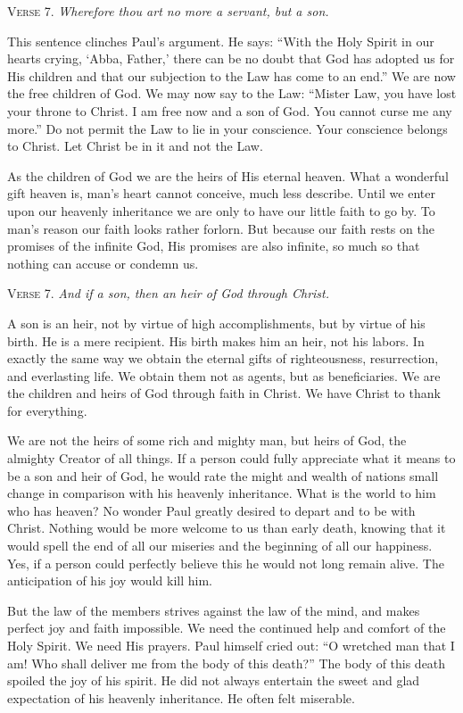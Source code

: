 \textsc{Verse} 7. \emph{Wherefore thou art no more a servant, but a son.}

This sentence clinches Paul’s argument. He says: “With the Holy Spirit in our hearts crying, ‘Abba, Father,’ there can be no doubt that God has adopted us for His children and that our subjection to the Law has come to an end.” We are now the free children of God. We may now say to the Law: “Mister Law, you have lost your throne to Christ. I am free now and a son of God. You cannot curse me any more.” Do not permit the Law to lie in your conscience. Your conscience belongs to Christ. Let Christ be in it and not the Law.

As the children of God we are the heirs of His eternal heaven. What a wonderful gift heaven is, man’s heart cannot conceive, much less describe. Until we enter upon our heavenly inheritance we are only to have our little faith to go by. To man’s reason our faith looks rather forlorn. But because our faith rests on the promises of the infinite God, His promises are also infinite, so much so that nothing can accuse or condemn us.

\textsc{Verse} 7. \emph{And if a son, then an heir of God through Christ.}

A son is an heir, not by virtue of high accomplishments, but by virtue of his birth. He is a mere recipient. His birth makes him an heir, not his labors. In exactly the same way we obtain the eternal gifts of righteousness, resurrection, and everlasting life. We obtain them not as agents, but as beneficiaries. We are the children and heirs of God through faith in Christ. We have Christ to thank for everything.

We are not the heirs of some rich and mighty man, but heirs of God, the almighty Creator of all things. If a person could fully appreciate what it means to be a son and heir of God, he would rate the might and wealth of nations small change in comparison with his heavenly inheritance. What is the world to him who has heaven? No wonder Paul greatly desired to depart and to be with Christ. Nothing would be more welcome to us than early death, knowing that it would spell the end of all our miseries and the beginning of all our happiness. Yes, if a person could perfectly believe this he would not long remain alive. The anticipation of his joy would kill him.

But the law of the members strives against the law of the mind, and makes perfect joy and faith impossible. We need the continued help and comfort of the Holy Spirit. We need His prayers. Paul himself cried out: “O wretched man that I am! Who shall deliver me from the body of this death?” The body of this death spoiled the joy of his spirit. He did not always entertain the sweet and glad expectation of his heavenly inheritance. He often felt miserable.

